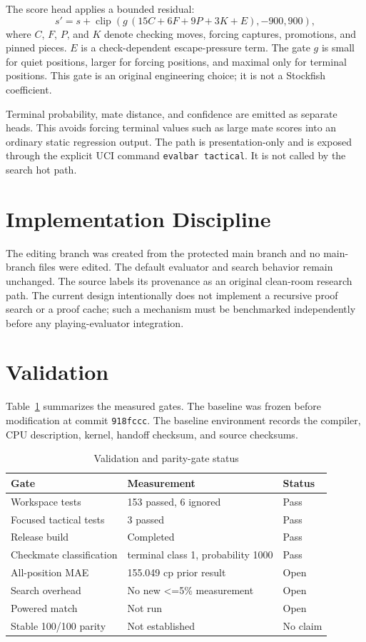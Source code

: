 \documentclass[conference]{IEEEtran}
\begin{document}
The score head applies a bounded residual:
\begin{equation}
 s' = s + \operatorname{clip}(g\,(15C + 6F + 9P + 3K + E), -900, 900),
\end{equation}
where $C$, $F$, $P$, and $K$ denote checking moves, forcing captures, promotions, and pinned pieces. $E$ is a check-dependent escape-pressure term. The gate $g$ is small for quiet positions, larger for forcing positions, and maximal only for terminal positions. This gate is an original engineering choice; it is not a Stockfish coefficient.

Terminal probability, mate distance, and confidence are emitted as separate heads. This avoids forcing terminal values such as large mate scores into an ordinary static regression output. The path is presentation-only and is exposed through the explicit UCI command \texttt{evalbar tactical}. It is not called by the search hot path.

\section{Implementation Discipline}
The editing branch was created from the protected main branch and no main-branch files were edited. The default evaluator and search behavior remain unchanged. The source labels its provenance as an original clean-room research path. The current design intentionally does not implement a recursive proof search or a proof cache; such a mechanism must be benchmarked independently before any playing-evaluator integration.

\section{Validation}
Table~\ref{tab:validation} summarizes the measured gates. The baseline was frozen before modification at commit \texttt{918fccc}. The baseline environment records the compiler, CPU description, kernel, handoff checksum, and source checksums.

\begin{table}[t]
\centering
\caption{Validation and parity-gate status}
\label{tab:validation}
\begin{tabular}{p{}p{}p{}}
\toprule
Gate & Measurement & Status\\
\midrule
Workspace tests & 153 passed, 6 ignored & Pass\\
Focused tactical tests & 3 passed & Pass\\
Release build & Completed & Pass\\
Checkmate classification & terminal class 1, probability 1000 & Pass\\
All-position MAE & 155.049 cp prior result & Open\\
Search overhead & No new <=5\% measurement & Open\\
Powered match & Not run & Open\\
Stable 100/100 parity & Not established & No claim\\
\bottomrule
\end{tabular}
\end{table}
\end{document}
